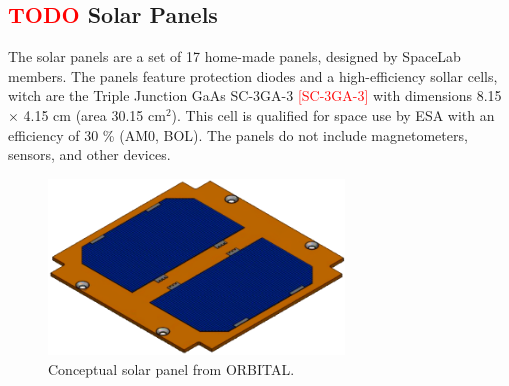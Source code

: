 \subsection{ \textcolor{red}{TODO} Solar Panels}

The solar panels are a set of 17 home-made panels, designed by SpaceLab members. The panels feature protection diodes and a high-efficiency sollar cells, witch are the Triple Junction GaAs SC-3GA-3 \textcolor{red}{[SC-3GA-3]} with dimensions 8.15 $\times$ 4.15 cm (area 30.15 cm$^{2}$). This cell is qualified for space use by ESA with an efficiency of 30 \% (AM0, BOL). The panels do not include magnetometers, sensors, and other devices. 

\begin{figure}[!ht]
    \begin{center}
        \includegraphics[width=0.7\textwidth]{figures/subsystems/orbital-solar-panel}
        \caption{Conceptual solar panel from ORBITAL.}
        \label{fig:solar-panel-orbital}
    \end{center}
\end{figure}

